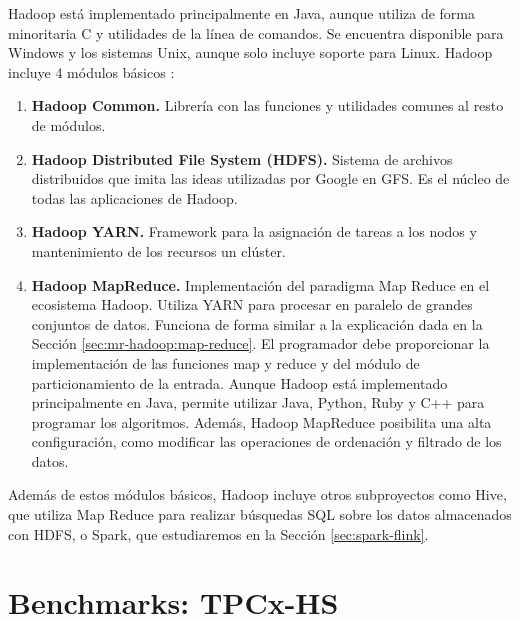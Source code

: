 \documentclass[10pt]{article}
\begin{document}
		Hadoop está implementado principalmente en Java, aunque utiliza de forma minoritaria C y utilidades de la línea de comandos. Se encuentra disponible para Windows y los sistemas Unix, aunque solo incluye soporte para Linux. Hadoop incluye 4 módulos básicos \cite{hadoop-doc}:
		 
		\begin{enumerate}
			\item \textbf{Hadoop Common.} Librería con las funciones y utilidades comunes al resto de módulos.
			\item \textbf{Hadoop Distributed File System (HDFS).} Sistema de archivos distribuidos que imita las ideas utilizadas por Google en GFS. Es el núcleo de todas las aplicaciones de Hadoop.
			\item \textbf{Hadoop YARN.} Framework para la asignación de tareas a los nodos y mantenimiento de los recursos un clúster.
			\item \textbf{Hadoop MapReduce.} Implementación del paradigma Map Reduce en el ecosistema Hadoop. Utiliza YARN para procesar en paralelo de grandes conjuntos de datos. Funciona de forma similar a la explicación dada en la Sección \ref{sec:mr-hadoop:map-reduce}. El programador debe proporcionar la implementación de las funciones map y reduce y del módulo de particionamiento de la entrada. Aunque Hadoop está implementado principalmente en Java, permite utilizar Java, Python, Ruby y C++ para programar los algoritmos. Además, Hadoop MapReduce posibilita una alta configuración, como modificar las operaciones de ordenación y filtrado de los datos.
		\end{enumerate}
		
		Además de estos módulos básicos, Hadoop incluye otros subproyectos como Hive, que utiliza Map Reduce para realizar búsquedas SQL sobre los datos almacenados con HDFS, o Spark, que estudiaremos en la Sección \ref{sec:spark-flink}.
		

\section{Benchmarks: TPCx-HS} \label{sec:tpcx-hs}
\end{document}
